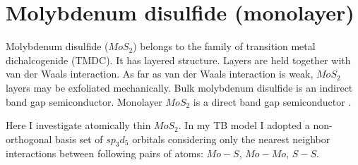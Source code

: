 \chapter{Molybdenum disulfide (monolayer)}
Molybdenum disulfide ($MoS_2$) belongs to the family of transition metal dichalcogenide (TMDC). It has layered structure. Layers are held together with van der Waals interaction. As far as van der Waals interaction is weak, $MoS_2$ layers may be exfoliated mechanically. Bulk molybdenum disulfide is an indirect band gap semiconductor. Monolayer $MoS_2$ is a direct band gap semiconductor \cite{mos2}.

Here I investigate atomically thin $MoS_2$. In my TB model I adopted a non-orthogonal basis set of $sp_3 d_5$ orbitals considering only the nearest neighbor interactions between following pairs of atoms: $Mo - S$, $Mo-Mo$, $S-S$.
